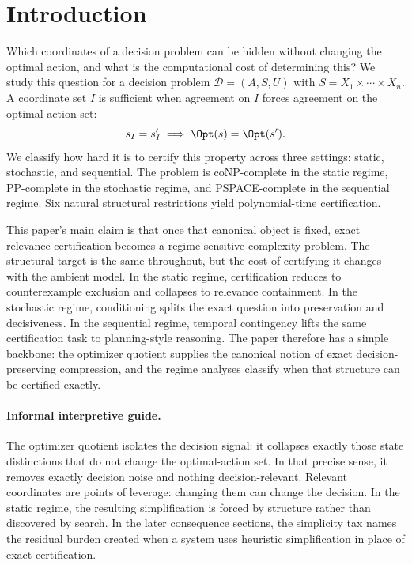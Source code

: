 \section{Introduction}\label{sec:introduction}

Which coordinates of a decision problem can be hidden without changing the optimal action, and what is the computational cost of determining this? We study this question for a decision problem $\mathcal{D}=(A,S,U)$ with $S = X_1 \times \cdots \times X_n$. A coordinate set $I$ is sufficient when agreement on $I$ forces agreement on the optimal-action set:
\[
s_I = s'_I \implies \Opt(s) = \Opt(s').
\]
We classify how hard it is to certify this property across three settings: static, stochastic, and sequential. The problem is coNP-complete in the static regime, PP-complete in the stochastic regime, and PSPACE-complete in the sequential regime. Six natural structural restrictions yield polynomial-time certification.

This paper's main claim is that once that canonical object is fixed, exact relevance certification becomes a regime-sensitive complexity problem. The structural target is the same throughout, but the cost of certifying it changes with the ambient model. In the static regime, certification reduces to counterexample exclusion and collapses to relevance containment. In the stochastic regime, conditioning splits the exact question into preservation and decisiveness. In the sequential regime, temporal contingency lifts the same certification task to planning-style reasoning. The paper therefore has a simple backbone: the optimizer quotient supplies the canonical notion of exact decision-preserving compression, and the regime analyses classify when that structure can be certified exactly. 

\paragraph{Informal interpretive guide.}
The optimizer quotient isolates the decision signal: it collapses exactly those state distinctions that do not change the optimal-action set. In that precise sense, it removes exactly decision noise and nothing decision-relevant. Relevant coordinates are points of leverage: changing them can change the decision. In the static regime, the resulting simplification is forced by structure rather than discovered by search. In the later consequence sections, the simplicity tax names the residual burden created when a system uses heuristic simplification in place of exact certification. 

